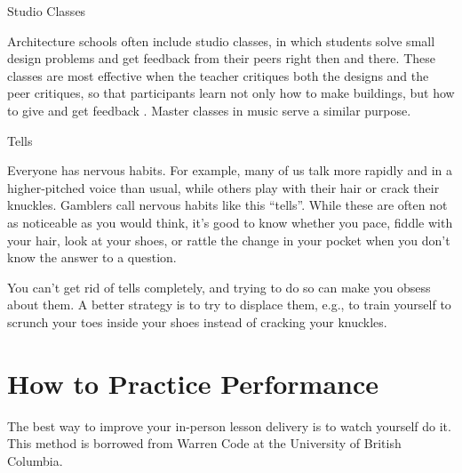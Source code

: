 \begin{callout}{Studio Classes}

  Architecture schools often include studio classes, in which students
  solve small design problems and get feedback from their peers right
  then and there. These classes are most effective when the teacher
  critiques both the designs and the peer critiques, so that
  participants learn not only how to make buildings, but how to give
  and get feedback \cite{Scho1984}. Master classes in music serve a
  similar purpose.

\end{callout}

\begin{callout}{Tells}

  Everyone has nervous habits. For example, many of us talk more
  rapidly and in a higher-pitched voice than usual, while others play
  with their hair or crack their knuckles.  Gamblers call nervous
  habits like this ``tells''. While these are often not as noticeable
  as you would think, it's good to know whether you pace, fiddle with
  your hair, look at your shoes, or rattle the change in your pocket
  when you don't know the answer to a question.

  You can't get rid of tells completely, and trying to do so can make
  you obsess about them. A better strategy is to try to displace them,
  e.g., to train yourself to scrunch your toes inside your shoes
  instead of cracking your knuckles.

\end{callout}
  
\section{How to Practice Performance}\label{s:performance-practice}

The best way to improve your in-person lesson delivery is to watch
yourself do it.  This method is borrowed from Warren Code at the
University of British Columbia.

